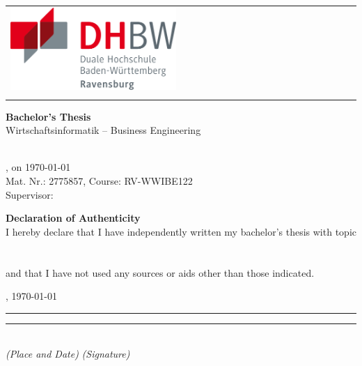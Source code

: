 \begin{titlepage}
	\noindent
    \begin{tabularx}{\textwidth}{@{}l|X@{}}
		\includegraphics[width=0.5\textwidth]{ressources/dhwb_logo.png} &
		\begin{minipage}[t]{\linewidth}
			\raggedright
			\Large \textbf{\myTitle} \\
			\vspace{0.5cm}
			\normalsize \mySubtitle
		\end{minipage}
	\end{tabularx}
	
    \vfill
    \centering
    \Large\textbf{Bachelor's Thesis} \\
    \vspace{1cm}
    \normalsize
    Wirtschaftsinformatik – Business Engineering\\
    \myHighSchool\\
    \myLocation
	
    \vfill
	\small
	\myName, on \today \\
	Mat. Nr.: 2775857, Course: RV-WWIBE122 \\
	Supervisor: \mySupervisor
\end{titlepage}

\clearpage
\thispagestyle{empty}
\begin{center}
	\Huge\textbf{Declaration of Authenticity}\\
    \vspace{4cm}
	\normalsize
	I hereby declare that I have independently written my bachelor's thesis with topic\\
    
    \vfill
    \Large \textbf{\myTitle} \\
    \large \mySubtitle \\
	
    \vfill
    \normalsize
	and that I have not used any sources or aids other than those indicated.\\
\end{center}
\vspace{4cm}
\myLocation, \today \\
\rule{6cm}{0.1pt} \hfill \rule{6cm}{0.1pt} \\
\textit{(Place and Date)} \hfill \textit{(Signature)}
\newpage

